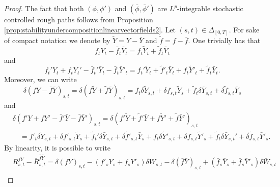 \documentclass[11pt,a4paper]{article}
\theoremstyle{plain}
\begin{document}
\begin{proof}
    The fact that both $(\phi,\phi')$ and $(\bar{\phi},\bar{\phi}')$ are $L^p$-integrable stochastic controlled rough paths follows from Proposition \ref{prop:stabilityundercompositionlinearvectorfields2}. 
    Let $(s,t) \in \Delta_{[0,T]}$. 
    For sake of compact notation we denote by $\tilde{Y}=Y-\bar{Y}$ and $\tilde{f}=f-\bar{f}$.
    One trivially has that \begin{equation*}
        f_tY_t -\bar{f}_t\bar{Y}_t =  f_t\tilde{Y}_t + \tilde{f}_t\bar{Y}_t
    \end{equation*} and \begin{equation*}
        f_t'Y_t+f_tY_t' - \bar{f}_t'\bar{Y}_t-\bar{f}_t\bar{Y}'_t = f_t' \tilde{Y}_t + \tilde{f}'_t \bar{Y}_t + f_t \tilde{Y}'_t + \tilde{f}_t \bar{Y}_t.
    \end{equation*}
    Moreover, we can write \begin{equation*}
        \delta (f Y-\bar{f} \bar{Y})_{s,t} = \delta (f \tilde{Y}+\tilde{f} \bar{Y})_{s,t} =  f_t \delta \tilde{Y}_{s,t} + \delta f_{s,t}\tilde{Y}_s+\tilde{f}_t\delta \bar{Y}_{s,t}+\delta \tilde{f}_{s,t}\bar{Y}_s
    \end{equation*}
    and \begin{equation*}
        \begin{aligned}
        &\delta (f' Y + f Y' - \bar{f}' \bar{Y} - \bar{f} \bar {Y}' )_{s,t} = \delta (f' \tilde{Y} +  \tilde{f}'\bar{Y}+ f \tilde{Y}' + \tilde{f} \bar{Y}')_{s,t}  \\ 
        &\quad = f'_t\delta\tilde{Y}_{s,t} + \delta f'_{s,t}\tilde{Y}_s+\tilde{f}_t'\delta \bar{Y}_{s,t} + \delta \tilde{f}'_{s,t}\bar{Y}_s+f_t\delta\tilde{Y}'_{s,t}+\delta f_{s,t}\tilde{Y}'_s + \tilde{f}_t \delta \bar{Y}_{s,t}' + \delta \tilde{f}_{s,t} \bar{Y}'_s.
    \end{aligned}
    \end{equation*}
    By linearity, it is possible to write \begin{equation*}
        \begin{aligned}
            &{R}_{s,t}^{{f} {Y}} - \bar{R}_{s,t}^{\bar{f} \bar{Y}} = \delta (f Y)_{s,t} - (f'_sY_s+f_sY'_s)\delta{W}_{s,t} - \delta (\bar{f} \bar{Y})_{s,t} + (\bar{f}_s\bar{Y}_s+\bar{f}_s\bar{Y}'_s)\delta{\bar{W}}_{s,t}  \\ 

\end{aligned}
\end{equation*}
\end{proof}
\end{document}
